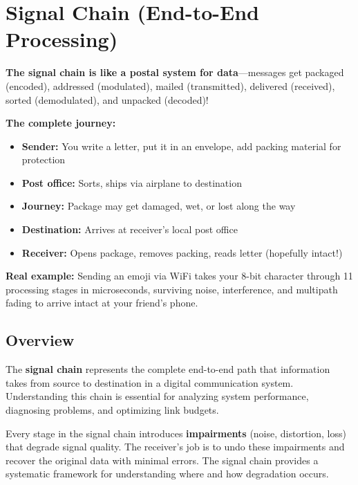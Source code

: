 \chapter{Signal Chain (End-to-End Processing)}
\label{ch:signal-chain}

\begin{nontechnical}
\textbf{The signal chain is like a postal system for data}---messages get packaged (encoded), addressed (modulated), mailed (transmitted), delivered (received), sorted (demodulated), and unpacked (decoded)!

\textbf{The complete journey:}
\begin{itemize}
\item \textbf{Sender:} You write a letter, put it in an envelope, add packing material for protection
\item \textbf{Post office:} Sorts, ships via airplane to destination
\item \textbf{Journey:} Package may get damaged, wet, or lost along the way
\item \textbf{Destination:} Arrives at receiver's local post office
\item \textbf{Receiver:} Opens package, removes packing, reads letter (hopefully intact!)
\end{itemize}

\textbf{Real example:} Sending an emoji via WiFi takes your 8-bit character through 11 processing stages in microseconds, surviving noise, interference, and multipath fading to arrive intact at your friend's phone.
\end{nontechnical}

\section{Overview}

The \textbf{signal chain} represents the complete end-to-end path that information takes from source to destination in a digital communication system. Understanding this chain is essential for analyzing system performance, diagnosing problems, and optimizing link budgets.

\begin{keyconcept}
Every stage in the signal chain introduces \textbf{impairments} (noise, distortion, loss) that degrade signal quality. The receiver's job is to undo these impairments and recover the original data with minimal errors. The signal chain provides a systematic framework for understanding where and how degradation occurs.
\end{keyconcept}


